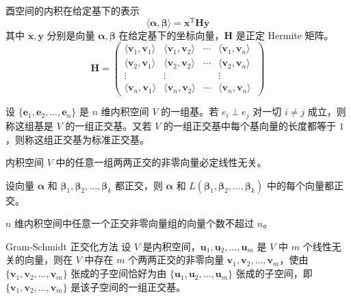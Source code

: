 \begin{definition}
    酉空间的内积在给定基下的表示
    \[
        \langle \bm{\alpha}, \bm{\beta} \rangle = \bm{x}^{\mathrm{T}}\bm{H}\overline{\bm{y}}
    \]
    其中 $\bm{x}, \bm{y}$ 分别是向量 $\bm{\alpha}, \bm{\beta}$ 在给定基下的坐标向量，$\bm{H}$ 是正定 Hermite 矩阵。
    \[
          \bm{H} = \begin{pmatrix}
            \langle \bm{v}_1, \bm{v}_1 \rangle & \langle \bm{v}_1, \bm{v}_2 \rangle & \cdots & \langle \bm{v}_1, \bm{v}_n \rangle   \\
            \langle \bm{v}_2, \bm{v}_1 \rangle & \langle \bm{v}_2, \bm{v}_2 \rangle & \cdots & \langle \bm{v}_2, \bm{v}_n \rangle   \\
            \vdots                             & \vdots                             & \      & \vdots                               \\
            \langle \bm{v}_n, \bm{v}_1 \rangle & \langle \bm{v}_n, \bm{v}_2 \rangle & \cdots & \langle \bm{v}_n, \bm{v}_n \rangle \
        \end{pmatrix}        
    \]
\end{definition}

\begin{definition}
    设 $\{\bm{e}_{1}, \bm{e}_{2}, \ldots, \bm{e}_{n}\}$ 是 $n$ 维内积空间 $V$ 的一组基。若 $e_{i} \perp e_{j}$ 对一切 $i \neq j$ 成立，则称这组基是 $V$ 的一组正交基。又若 $V$ 的一组正交基中每个基向量的长度都等于 $1$，则称这组正交基为标准正交基。
\end{definition}

\begin{lemma}
    内积空间 $V$ 中的任意一组两两正交的非零向量必定线性无关。
\end{lemma}

\begin{lemma}
    设向量 $\bm{\alpha}$ 和 $\bm{\beta}_1, \bm{\beta}_2, \ldots, \bm{\beta}_k$ 都正交，则 $\bm{\alpha}$ 和 $L(\bm{\beta}_1, \bm{\beta}_2, \ldots, \bm{\beta}_k)$ 中的每个向量都正交。
\end{lemma}

\begin{corollary}
    $n$ 维内积空间中任意一个正交非零向量组的向量个数不超过 $n$。
\end{corollary}

\begin{theorem}{Gram-Schmidt 正交化方法}
    设 $V$ 是内积空间，$\bm{u}_1, \bm{u}_2, \ldots, \bm{u}_m$ 是 $V$ 中 $m$ 个线性无关的向量，则在 $V$ 中存在 $m$ 个两两正交的非零向量 $\bm{v}_1, \bm{v}_2, \ldots,\bm{v}_m$，使由 $\{\bm{v}_1, \bm{v}_2, \ldots,\bm{v}_m\}$ 张成的子空间恰好为由 $\{\bm{u}_1, \bm{u}_2, \ldots, \bm{u}_m\}$ 张成的子空间，即 $\{\bm{v}_1, \bm{v}_2, \ldots,\bm{v}_m\}$ 是该子空间的一组正交基。
\end{theorem}

